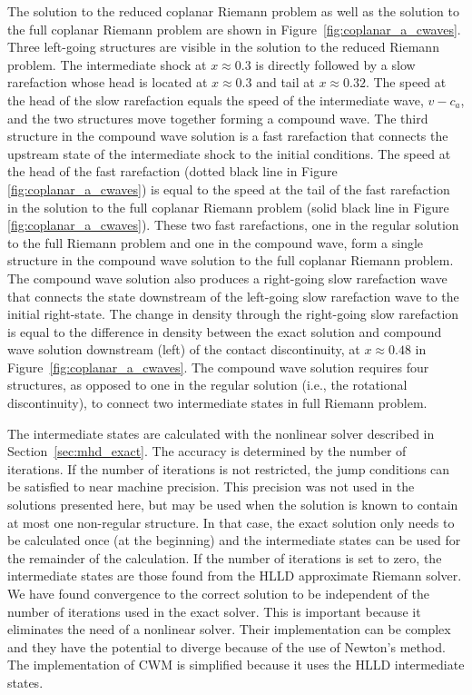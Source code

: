The solution to the reduced coplanar Riemann problem as well as the solution to the full coplanar Riemann problem are shown in Figure~\ref{fig:coplanar_a_cwaves}.  Three left-going structures are visible in the solution to the reduced Riemann problem.  The intermediate shock at $x\approx 0.3$ is directly followed by a slow rarefaction whose head is located at $x\approx 0.3$ and tail at $x\approx 0.32$.  The speed at the head of the slow rarefaction equals the speed of the intermediate wave, $v - c_a$, and the two structures move together forming a compound wave.  The third structure in the compound wave solution is a fast rarefaction that connects the upstream state of the intermediate shock to the initial conditions.  The speed at the head of the fast rarefaction (dotted black line in Figure \ref{fig:coplanar_a_cwaves}) is equal to the speed at the tail of the fast rarefaction in the solution to the full coplanar Riemann problem (solid black line in Figure \ref{fig:coplanar_a_cwaves}).  These two fast rarefactions, one in the regular solution to the full Riemann problem and one in the compound wave, form a single structure in the compound wave solution to the full coplanar Riemann problem.  The compound wave solution also produces a right-going slow rarefaction wave that connects the state downstream of the left-going slow rarefaction wave to the initial right-state.  The change in density through the right-going slow rarefaction is equal to the difference in density between the exact solution and compound wave solution downstream (left) of the contact discontinuity, at $x\approx 0.48$ in Figure~\ref{fig:coplanar_a_cwaves}.  The compound wave solution requires four structures, as opposed to one in the regular solution (i.e., the rotational discontinuity), to connect two intermediate states in full Riemann problem.  

The intermediate states are calculated with the nonlinear solver described in Section~\ref{sec:mhd_exact}.  The accuracy is determined by the number of iterations.  If the number of iterations is not restricted, the jump conditions can be satisfied to near machine precision.  This precision was not used in the solutions presented here, but may be used when the solution is known to contain at most one non-regular structure.  In that case, the exact solution only needs to be calculated once (at the beginning) and the intermediate states can be used for the remainder of the calculation.  If the number of iterations is set to zero, the intermediate states are those found from the HLLD approximate Riemann solver.  We have found convergence to the correct solution to be independent of the number of iterations used in the exact solver.  This is important because it eliminates the need of a nonlinear solver.  Their implementation can be complex and they have the potential to diverge because of the use of Newton's method.  The implementation of CWM is simplified because it uses the HLLD intermediate states.  

